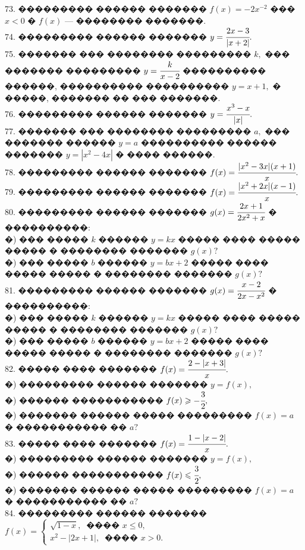 \documentclass[12pt]{article}
\begin{document}
73. ��������� ������ ������� $f(x)=-2x^{-2}$ ��� $x<0$ � $f(x)$ --- �������� �������.\\
74. ��������� ������ ������� $y=\cfrac{2x-3}{|x+2|}.$\\
75. ������� ��� �������� ��������� $k,$ ��� ������� ��������� $y=\cfrac{k}{x-2}$ ���������� ������, ���������� ���������� $y=x+1,$ � �����, ������� �� ��� �������.\\
76. ��������� ������ ������� $y=\cfrac{x^3-x}{|x|}.$\\
77. ������� ��� �������� ��������� $a,$ ��� ������� ������ $y=a$ ���������� ������ ������� $y=|x^2-4x|$ � ���� ������.\\
78. ��������� ������ ������� $f(x)=\cfrac{|x^2-3x|(x+1)}{x}.$\\
79. ��������� ������ ������� $f(x)=\cfrac{|x^2+2x|(x-1)}{x}.$\\
80. ��������� ������ ������� $g(x)=\cfrac{2x+1}{2x^2+x}$ � ����������:\\
�) ��� ����� $k$ ������ $y=kx$ ����� ���� ����� ����� � �������� ������� $g(x)?$\\
�) ��� ����� $b$ ������ $y=bx+2$ ����� ���� ����� ����� � �������� ������� $g(x)?$\\
81. ��������� ������ ������� $g(x)=\cfrac{x-2}{2x-x^2}$ � ����������:\\
�) ��� ����� $k$ ������ $y=kx$ ����� ���� ����� ����� � �������� ������� $g(x)?$\\
�) ��� ����� $b$ ������ $y=bx+2$ ����� ���� ����� ����� � �������� ������� $g(x)?$\\
82. ����� ���� ������� $f(x)=\cfrac{2-|x+3|}{x}.$\\
�) ��������� ������ ������� $y=f(x),$\\
�) ������ ����������� $f(x)\geqslant-\cfrac{3}{2},$\\
�) ������� ������ ����� ��������� $f(x)=a$ � ����������� �� $a?$\\
83. ����� ���� ������� $f(x)=\cfrac{1-|x-2|}{x}.$\\
�) ��������� ������ ������� $y=f(x),$\\
�) ������ ����������� $f(x)\leqslant\cfrac{3}{2},$\\
�) ������� ������ ����� ��������� $f(x)=a$ � ����������� �� $a?$\\
84. ��������� ������ ������� $f(x)=\begin{cases} \sqrt{1-x},\ \text{ ���� } x\leqslant0,\\
x^2-|2x+1|,\ \text{ ���� } x>0.\end{cases}$\\
\end{document}
